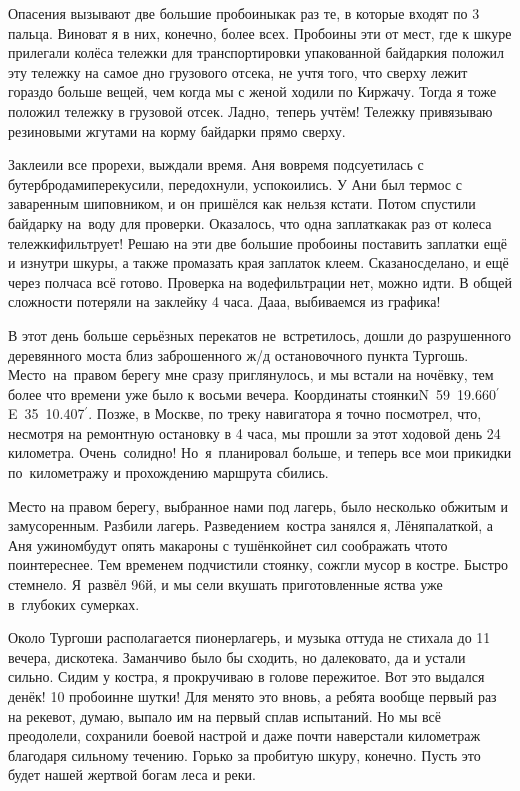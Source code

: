 Опасения вызывают две большие пробоины\mdash как раз те, в которые входят по 3 пальца. Виноват я в них, конечно, более всех. Пробоины эти от мест, где к шкуре прилегали колёса тележки для транспортировки упакованной байдарки\mdash я положил эту тележку на самое дно грузового отсека, не учтя того, что сверху лежит гораздо больше вещей, чем когда мы с женой ходили по Киржачу. Тогда я тоже положил тележку в грузовой отсек. Ладно,~теперь учтём! Тележку привязываю резиновыми жгутами на корму байдарки прямо сверху. 

Заклеили все прорехи, выждали время. Аня вовремя подсуетилась с бутербродами\mdash перекусили, передохнули, успокоились. У Ани был термос с заваренным шиповником, и он пришёлся как нельзя кстати. Потом спустили байдарку на~воду для проверки. Оказалось, что одна заплатка\mdash как раз от колеса тележки\mdash фильтрует! Решаю на эти две большие пробоины поставить заплатки ещё и изнутри шкуры, а также промазать края заплаток клеем. Сказано\mdash сделано, и ещё через полчаса всё готово. Проверка на воде\mdash фильтрации нет, можно идти. В общей сложности потеряли на заклейку 4 часа. Да\sdash а\sdash а, выбиваемся из графика! 

В этот день больше серьёзных перекатов не~встретилось, дошли до разрушенного деревянного моста близ заброшенного ж/д остановочного пункта Тургошь. Место~на~правом берегу мне сразу приглянулось, и мы встали на ночёвку, тем более что времени уже было к восьми вечера. Координаты стоянки\mdash N~59\degree~19.660$^\prime$~ E~35\degree~10.407$^\prime$. Позже, в Москве, по треку навигатора я точно посмотрел, что, несмотря на ремонтную остановку в 4 часа, мы прошли за этот ходовой день 24 километра. Очень~солидно! Но~я~планировал больше, и теперь все мои прикидки по~километражу и прохождению маршрута сбились.
 
Место на правом берегу, выбранное нами под лагерь, было несколько обжитым и замусоренным. Разбили лагерь. Разведением~костра занялся я, Лёня\mdash палаткой, а Аня ужином\mdash будут опять макароны с тушёнкой\mdash нет сил соображать что\sdash то поинтереснее. Тем временем подчистили стоянку, сожгли мусор в костре. Быстро стемнело. Я~развёл 96\sdash й, и мы сели вкушать приготовленные яства уже в~глубоких сумерках.

Около Тургоши располагается пионерлагерь, и музыка оттуда не стихала до 11 вечера, дискотека. Заманчиво было бы сходить, но далековато, да и устали сильно. Сидим у костра, я прокручиваю в голове пережитое. Вот это выдался денёк! 10 пробоин\mdash не шутки! Для меня\sdash то это вновь, а ребята вообще первый раз на реке\mdash вот, думаю, выпало им на первый сплав испытаний. Но мы всё преодолели, сохранили боевой настрой и даже почти наверстали километраж благодаря сильному течению. Горько за пробитую шкуру, конечно. Пусть это будет нашей жертвой богам леса и реки.

